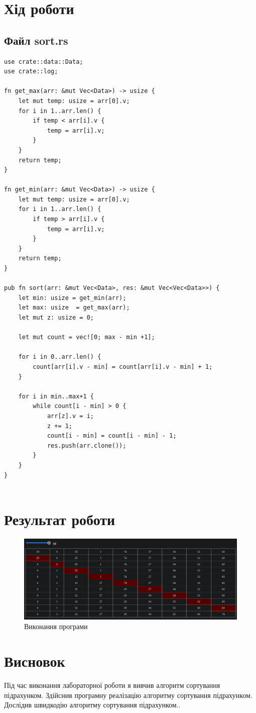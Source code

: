 \documentclass{article}
\begin{document}
\begin{normalsize}
		\newpage
		
		\section*{Хід роботи}
		\subsection*{Файл sort.rs}
		\begin{lstlisting}
use crate::data::Data;
use crate::log;

fn get_max(arr: &mut Vec<Data>) -> usize {
	let mut temp: usize = arr[0].v;
	for i in 1..arr.len() {
		if temp < arr[i].v {
			temp = arr[i].v;
		}
	}
	return temp;
}

fn get_min(arr: &mut Vec<Data>) -> usize {
	let mut temp: usize = arr[0].v;
	for i in 1..arr.len() {
		if temp > arr[i].v {
			temp = arr[i].v;
		}
	}
	return temp;
}

pub fn sort(arr: &mut Vec<Data>, res: &mut Vec<Vec<Data>>) {
	let min: usize = get_min(arr);
	let max: usize  = get_max(arr);
	let mut z: usize = 0;
	
	let mut count = vec![0; max - min +1];
	
	for i in 0..arr.len() {
		count[arr[i].v - min] = count[arr[i].v - min] + 1;
	}
	
	for i in min..max+1 {
		while count[i - min] > 0 {
			arr[z].v = i;
			z += 1;
			count[i - min] = count[i - min] - 1;
			res.push(arr.clone());
		}
	}
}


\end{lstlisting}
		
		\section*{Результат роботи}
		\begin{figure}[H]
			\centering
			\includegraphics[scale=0.36]{1}
			\caption{Виконання програми}
		\end{figure}
		
		\section*{Висновок}
		Під час виконання лабораторної роботи я вивчив алгоритм сортування підрахунком. Здійснив програмну реалізацію алгоритму сортування підрахунком. Дослідив швидкодію алгоритму сортування підрахунком..
		
	\end{normalsize}
\end{document}
